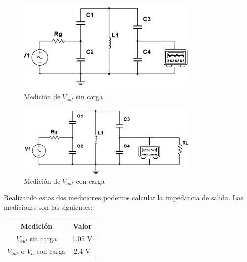 %
\begin{figure}[h]
    \centering
    \includegraphics[width=0.8\textwidth]{Imagenes/medicion_zout1.png}
    \caption{Medición de $V_{out}$ sin carga}
    \label{fig: Primer esquema de la medición de la impedancia de salida}
\end{figure}

% 
\begin{figure}[h]
    \centering
    \includegraphics[width=0.8\textwidth]{Imagenes/medicion_zout2.png}
    \caption{Medición de $V_{out}$ con carga}
    \label{fig: Segundo esquema de la medición de la impedancia de salida}
\end{figure}




Realizando estas dos mediciones podemos calcular la impedancia de salida. Las mediciones son las siguientes:

\begin{table}[h]
    \centering
    \begin{tabular}{cc}
    \rowcolor[HTML]{C0C0C0} 
    \textbf{Medición} & \textbf{Valor} \\ \hline
    $V_{out}$ sin carga            & 1.05  V         \\ \hline
    $V_{out}$ o $V_{L}$ con carga         & 2.4 V         \\ \hline
    \end{tabular}
\end{table}

